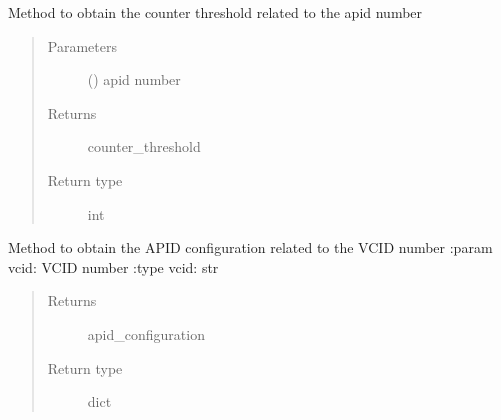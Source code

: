 
\begin{fulllineitems}
\label{\detokenize{s2boa.ingestions:s2boa.ingestions.functions.get_counter_threshold_from_apid}}
Method to obtain the counter threshold related to the apid number
\begin{quote}\begin{description}
\item[{Parameters}] \leavevmode
{} () \textendash{} apid number

\item[{Returns}] \leavevmode
counter\_threshold

\item[{Return type}] \leavevmode
int

\end{description}\end{quote}

\end{fulllineitems}


\begin{fulllineitems}
\label{\detokenize{s2boa.ingestions:s2boa.ingestions.functions.get_vcid_apid_configuration}}
Method to obtain the APID configuration related to the VCID number
:param vcid: VCID number
:type vcid: str
\begin{quote}\begin{description}
\item[{Returns}] \leavevmode
apid\_configuration

\item[{Return type}] \leavevmode
dict

\end{description}\end{quote}

\end{fulllineitems}


